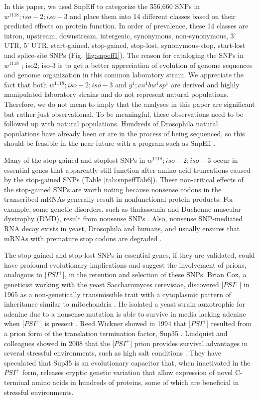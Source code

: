 In this paper, we used SnpEff to categorize the \~356,660 SNPs in $w^{1118} ; iso-2; iso-3$ and place them into 14 different classes based on their predicted effects on protein function. In order of prevalence, these 14 classes are intron, upstream, downstream, intergenic, synonymous, non-synonymous, 3' UTR, 5' UTR, start-gained, stop-gained, stop-lost, synonymous-stop, start-lost and splice-site SNPs (Fig. \ref{fig:snpeff1}). The reason for cataloging the SNPs in $w^{1118}$ ; iso2; iso-3 is to get a better appreciation of evolution of genome sequences and genome organization in this common laboratory strain. We appreciate the fact that both $w^{1118} ; iso-2; iso-3$ and $y^1 ; cn^1 bw^1 sp^1$ are derived and highly manipulated laboratory strains and do not represent natural populations. Therefore, we do not mean to imply that the analyses in this paper are significant but rather just observational. To be meaningful, these observations need to be followed up with natural populations. Hundreds of Drosophila natural populations have already been or are in the process of being sequenced, so this should be feasible in the near future with a program such as SnpEff \cite{anderson2009molecular}.

Many of the stop-gained and stoplost SNPs in $w^{1118} ; iso-2; iso-3$ occur in essential genes that apparently still function after amino acid truncations caused by the stop-gained SNPs (Table \ref{tab:snpeffTab6}). These non-critical effects of the stop-gained SNPs are worth noting because nonsense codons in the transcribed mRNAs generally result in nonfunctional protein products. For example, some genetic disorders, such as thalassemia and Duchenne muscular dystrophy (DMD), result from nonsense SNPs \cite{flanigan2009dmd,tran2007nonsense,chang1979beta}. Also, nonsense SNP-mediated RNA decay exists in yeast, Drosophila and humans, and usually ensures that mRNAs with premature stop codons are degraded \cite{gatfield2003nonsense}.

The stop-gained and stop-lost SNPs in essential genes, if they are validated, could have profound evolutionary implications and suggest the involvement of prions, analogous to [$PSI^+$], in the retention and selection of these SNPs.  Brian Cox, a geneticist working with the yeast Saccharomyces cerevisiae, discovered [$PSI^+$] in 1965 as a non-genetically transmissible trait with a cytoplasmic pattern of inheritance similar to mitochondria \cite{cox1988psi}. He isolated a yeast strain auxotrophic for adenine due to a nonsense mutation is able to survive in media lacking adenine when [$PSI^+$] is present \cite{cox1988psi}. Reed Wickner showed in 1994 that [$PSI^+$] resulted from a prion form of the translation termination factor, Sup35 \cite{wickner1994ure3}. Lindquist and colleagues showed in 2008 that the [$PSI^+$] prion provides survival advantages in several stressful environments, such as high salt conditions \cite{tyedmers2008prion}. They have speculated that Sup35 is an evolutionary capacitor that, when inactivated in the $PSI^+$ form, releases cryptic genetic variation that allow expression of novel C-terminal amino acids in hundreds of proteins, some of which are beneficial in stressful environments. 

